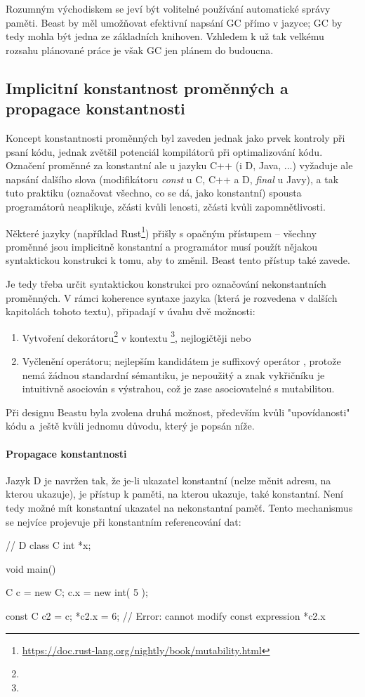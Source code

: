 Rozumným východiskem se jeví být volitelné používání automatické správy paměti. Beast by měl umožňovat efektivní napsání GC přímo v jazyce; GC by tedy mohla být jedna ze základních knihoven. Vzhledem k už tak velkému rozsahu plánované práce je však GC jen plánem do budoucna.

\subsection{Implicitní konstantnost proměnných a propagace konstantnosti}
Koncept konstantnosti proměnných byl zaveden jednak jako prvek kontroly při psaní kódu, jednak zvětšil potenciál kompilátorů při optimalizování kódu. Označení proměnné za konstantní ale u jazyku C++ (i D, Java, ...) vyžaduje ale napsání dalšího slova (modifikátoru \textit{const} u C, C++ a D, \textit{final} u Javy), a tak tuto praktiku (označovat všechno, co se dá, jako konstantní) spousta programátorů neaplikuje, zčásti kvůli lenosti, zčásti kvůli zapomnětlivosti.

Některé jazyky (například Rust\footnote{\url{https://doc.rust-lang.org/nightly/book/mutability.html}}) přišly s opačným přístupem -- všechny proměnné jsou implicitně konstantní a programátor musí použít nějakou syntaktickou konstrukci k tomu, aby to změnil. Beast tento přístup také zavede.

Je tedy třeba určit syntaktickou konstrukci pro označování nekonstantních proměnných. V rámci koherence syntaxe jazyka (která je rozvedena v dalších kapitolách tohoto textu), připadají  v úvahu dvě možnosti:
\begin{enumerate}
	\item Vytvoření dekorátoru\footnote{} v kontextu \footnote{}, nejlogičtěji  nebo 
	\item Vyčlenění operátoru; nejlepším kandidátem je suffixový operátor , protože nemá žádnou standardní sémantiku, je nepoužitý a znak vykřičníku je intuitivně asociován s výstrahou, což je zase asociovatelné s mutabilitou.
\end{enumerate}

Při designu Beastu byla zvolena druhá možnost, především kvůli "upovídanosti" kódu a~ještě kvůli jednomu důvodu, který je popsán níže.

\paragraph{Propagace konstantnosti} \label{constPropagation} Jazyk D je navržen tak, že je-li ukazatel konstantní (nelze měnit adresu, na kterou ukazuje), je přístup k paměti, na kterou ukazuje, také konstantní. Není tedy možné mít konstantní ukazatel na nekonstantní paměť. Tento mechanismus se nejvíce projevuje při konstantním referencování dat:
\begin{dcode}
// D
class C {
	int *x;
}

void main() {
	C c = new C;
	c.x = new int( 5 );
	
	const C c2 = c;
	*c2.x = 6; // Error: cannot modify const expression *c2.x
}
\end{dcode}

